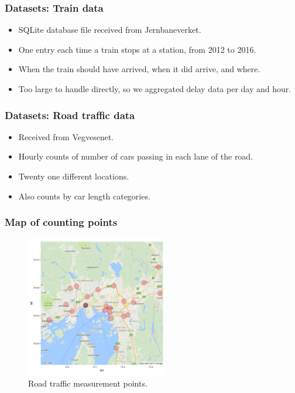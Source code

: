 \documentclass{beamer}
\begin{document}
\begin{frame}\frametitle{Datasets: Train data}
\begin{itemize}
\item SQLite database file received from Jernbaneverket.
\item One entry each time a train stops at a station, from 2012 to 2016.
\item When the train should have arrived, when it did arrive, and where.
\item Too large to handle directly, so we aggregated delay data per day and hour.
\end{itemize}
\end{frame}


\begin{frame}\frametitle{Datasets: Road traffic data}
\begin{itemize}
\item Received from Vegvesenet.
\item Hourly counts of number of cars passing in each lane of the road.
\item Twenty one different locations.
\item Also counts by car length categories.
\end{itemize}
\end{frame}

\begin{frame}\frametitle{Map of counting points}
\begin{figure}
\includegraphics[width=0.55\textwidth]{map_oslo_tellepunkt_modif.png}
\caption {Road traffic measurement points.}
\end{figure}
\end{frame}
\end{document}
